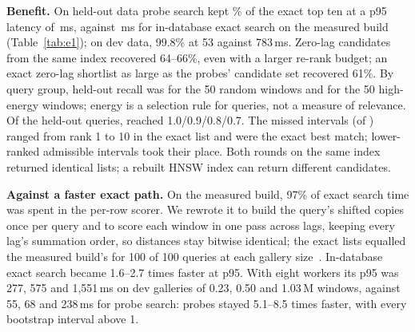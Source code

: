 \documentclass[sigconf]{acmart}
\begin{document}
\begin{table}[t]
\caption{E1, held-out data (234,622 windows, 100 queries, 200 timings per arm). Recall@10: mean / minimum / queries below 0.9.}
\label{tab:e1}
\small\setlength{\tabcolsep}{2.5pt}

\end{table}

\textbf{Benefit.} On held-out data probe search kept \EHoPctPR\% of the exact top ten at a p95 latency of \EHoPninetyfivePR\,ms, against \EHoPninetyfiveExact\,ms for in-database exact search on the measured build (Table~\ref{tab:e1}); on dev data, 99.8\% at 53 against 783\,ms. Zero-lag candidates from the same index recovered 64--66\%, even with a larger re-rank budget; an exact zero-lag shortlist as large as the probes' candidate set recovered 61\%. By query group, held-out recall was \EHoRandomPR{} for the 50 random windows and \EHoEnergeticPR{} for the 50 high-energy windows; energy is a selection rule for queries, not a measure of relevance. Of the \EHoQueries{} held-out queries, \EHoHist{} reached 1.0/0.9/0.8/0.7. The \EHoMissed{} missed intervals (of \EHoRefItems) ranged from rank 1 to 10 in the exact list and \EHoMissedRankOne{} were the exact best match; lower-ranked admissible intervals took their place. Both rounds on the same index returned identical lists; a rebuilt HNSW index can return different candidates.

\textbf{Against a faster exact path.} On the measured build, 97\% of exact search time was spent in the per-row scorer. We rewrote it to build the query's shifted copies once per query and to score each window in one pass across lags, keeping every lag's summation order, so distances stay bitwise identical; the exact lists equalled the measured build's for 100 of 100 queries at each gallery size~\cite{e6}. In-database exact search became 1.6--2.7 times faster at p95. With eight workers its p95 was 277, 575 and 1,551\,ms on dev galleries of 0.23, 0.50 and 1.03\,M windows, against 55, 68 and 238\,ms for probe search: probes stayed 5.1--8.5 times faster, with every bootstrap interval above 1.
\end{document}
